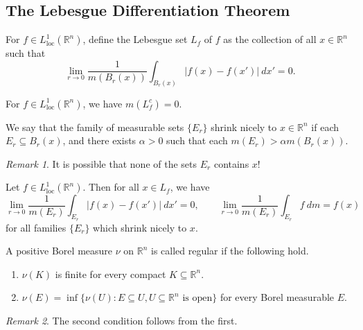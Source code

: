 \documentclass[11pt]{article}
\newcommand{\R}{\mathbb{R}}
\newcommand{\Lloc}{L^1_\text{loc}}
\theoremstyle{definition}
\theoremstyle{remark}
\newtheorem*{remark}{Remark}
\begin{document}
    \subsection{The Lebesgue Differentiation Theorem}

    \begin{definition}
        For $f \in \Lloc(\R^n)$, define the Lebesgue set $L_f$ of $f$ as the
        collection of all $x \in \R^n$ such that \[
            \lim_{r \to 0} \frac{1}{m(B_r(x))} \int_{B_r(x)} |f(x) - f(x')| \:dx' = 0.
        \]
    \end{definition}

    \begin{lemma}
        For $f \in \Lloc(\R^n)$, we have $m(L_f^c) = 0$.
    \end{lemma}

    \begin{definition}
        We say that the family of measurable sets $\{E_r\}$ shrink nicely to $x
        \in \R^n$ if each $E_r \subseteq B_r(x)$, and there exists $\alpha > 0$ such
        that each $m(E_r) > \alpha m(B_r(x))$.

        \begin{remark}
            It is possible that none of the sets $E_r$ contains $x$!
        \end{remark}
    \end{definition}

    \begin{theorem}
        Let $f \in \Lloc(\R^n)$. Then for all $x \in L_f$, we have \[
            \lim_{r \to 0} \frac{1}{m(E_r)} \int_{E_r} |f(x) - f(x')|\:dx' = 0, \qquad
            \lim_{r \to 0} \frac{1}{m(E_r)} \int_{E_r} f \:dm = f(x)
        \] for all families $\{E_r\}$ which shrink nicely to $x$.
    \end{theorem}


    \begin{definition}
        A positive Borel measure $\nu$ on $\R^n$ is called regular if the following
        hold. \begin{enumerate}
            \item $\nu(K)$ is finite for every compact $K \subseteq \R^n$.
            \item $\nu(E) = \inf\{\nu(U): E \subseteq U, U \subseteq \R^n\text{ is
            open}\}$ for every Borel measurable $E$.
        \end{enumerate}

        \begin{remark}
            The second condition follows from the first.
        \end{remark}
    \end{definition}
\end{document}
